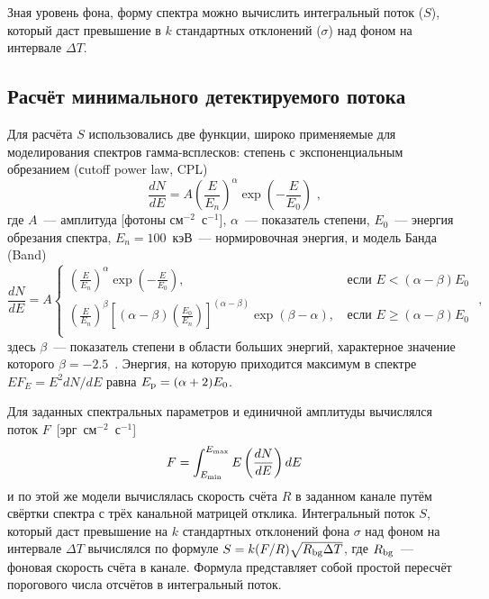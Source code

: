 Зная уровень фона, форму спектра можно вычислить интегральный поток ($S$), который 
даст превышение в $k$ стандартных отклонений ($\sigma$) над фоном на интервале $\Delta T$.

\subsection{Расчёт минимального детектируемого потока}
Для расчёта $S$ использовались две функции, широко применяемые для моделирования 
спектров гамма-всплесков: степень с экспоненциальным обрезанием (сutoff power law, CPL)
\begin{equation}\label{eq:CPL}
\frac{dN}{dE} = A \left(\frac{E}{E_n}\right)^\alpha \exp\left(-\frac{E}{E_0}\right) \mbox{ ,}
\end{equation}
где $A$~--- амплитуда [фотоны см$^{-2}$~с$^{-1}$], $\alpha$~--- показатель степени,
$E_0$~--- энергия обрезания спектра, $E_n = 100$~кэВ~--- нормировочная энергия,
и модель Банда (Band)~\citep{Band_1993ApJ}
\begin{equation}\label{eq:Band}
\frac{dN}{dE}=A \left\{
\begin{array}{lr}
\left(\frac{E}{E_n}\right)^\alpha \exp\left(-\frac{E}{E_0}\right) \mbox{, } 
&\mbox{если } E<(\alpha-\beta)E_0\\
\left(\frac{E}{E_n}\right)^\beta 
\left[(\alpha-\beta)\left(\frac{E_0}{E_n}\right)\right]^{(\alpha-\beta)} 
\exp(\beta-\alpha)  \mbox{, } &\mbox{если } E\geq(\alpha-\beta)E_0 \\
\end{array}
\right. \mbox{ ,}
\end{equation}
здесь $\beta$~--- показатель степени в области больших энергий, 
характерное значение которого $\beta = -2.5$~\citep{Goldstein_2013ApJS, Gruber_2014ApJS}. 
Энергия, на которую приходится максимум в спектре $E F_E = E^2 dN/dE$ равна $E_{\mathrm{p}}=(\alpha+2) E_0$.

Для заданных спектральных параметров и единичной амплитуды вычислялся поток $F$~[эрг~см$^{-2}$~с$^{-1}$]
\begin{equation}\label{eq:flux}
F = \int_{E_{\mathrm{min}}}^{E_{\mathrm{max}}} E \left(\frac{dN}{dE}\right) dE
\end{equation}
и по этой же модели вычислялась скорость счёта $R$ в заданном канале путём свёртки 
спектра с трёх канальной матрицей отклика. Интегральный поток $S$, который даст 
превышение на $k$ стандартных отклонений фона $\sigma$ над фоном на интервале $\Delta T$ 
вычислялся по формуле $S = k (F/R) \sqrt{R_{\mathrm{bg}} \Delta T}$, 
где $R_{\mathrm{bg}}$~--- фоновая скорость счёта в канале. Формула представляет собой простой 
пересчёт порогового числа отсчётов в интегральный поток.

